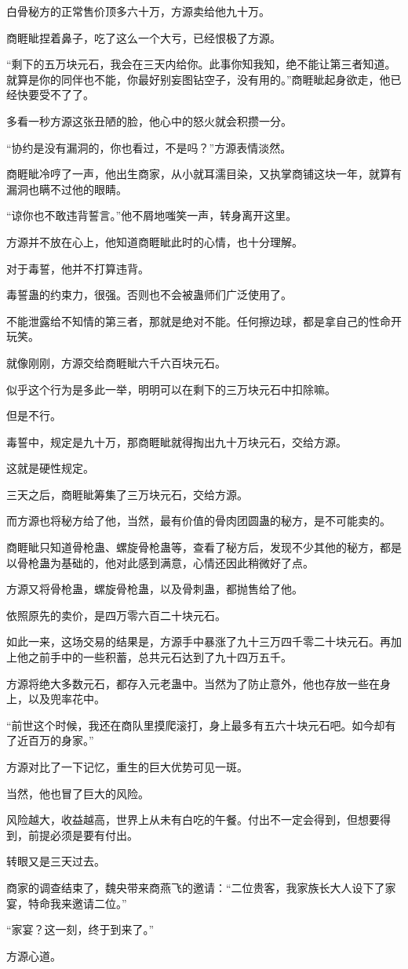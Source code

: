 \begin{this_body}
白骨秘方的正常售价顶多六十万，方源卖给他九十万。

商睚眦捏着鼻子，吃了这么一个大亏，已经恨极了方源。

“剩下的五万块元石，我会在三天内给你。此事你知我知，绝不能让第三者知道。就算是你的同伴也不能，你最好别妄图钻空子，没有用的。”商睚眦起身欲走，他已经快要受不了了。

多看一秒方源这张丑陋的脸，他心中的怒火就会积攒一分。

“协约是没有漏洞的，你也看过，不是吗？”方源表情淡然。

商睚眦冷哼了一声，他出生商家，从小就耳濡目染，又执掌商铺这块一年，就算有漏洞也瞒不过他的眼睛。

“谅你也不敢违背誓言。”他不屑地嗤笑一声，转身离开这里。

方源并不放在心上，他知道商睚眦此时的心情，也十分理解。

对于毒誓，他并不打算违背。

毒誓蛊的约束力，很强。否则也不会被蛊师们广泛使用了。

不能泄露给不知情的第三者，那就是绝对不能。任何擦边球，都是拿自己的性命开玩笑。

就像刚刚，方源交给商睚眦六千六百块元石。

似乎这个行为是多此一举，明明可以在剩下的三万块元石中扣除嘛。

但是不行。

毒誓中，规定是九十万，那商睚眦就得掏出九十万块元石，交给方源。

这就是硬性规定。

三天之后，商睚眦筹集了三万块元石，交给方源。

而方源也将秘方给了他，当然，最有价值的骨肉团圆蛊的秘方，是不可能卖的。

商睚眦只知道骨枪蛊、螺旋骨枪蛊等，查看了秘方后，发现不少其他的秘方，都是以骨枪蛊为基础的，他对此感到满意，心情还因此稍微好了点。

方源又将骨枪蛊，螺旋骨枪蛊，以及骨刺蛊，都抛售给了他。

依照原先的卖价，是四万零六百二十块元石。

如此一来，这场交易的结果是，方源手中暴涨了九十三万四千零二十块元石。再加上他之前手中的一些积蓄，总共元石达到了九十四万五千。

方源将绝大多数元石，都存入元老蛊中。当然为了防止意外，他也存放一些在身上，以及兜率花中。

“前世这个时候，我还在商队里摸爬滚打，身上最多有五六十块元石吧。如今却有了近百万的身家。”

方源对比了一下记忆，重生的巨大优势可见一斑。

当然，他也冒了巨大的风险。

风险越大，收益越高，世界上从未有白吃的午餐。付出不一定会得到，但想要得到，前提必须是要有付出。

转眼又是三天过去。

商家的调查结束了，魏央带来商燕飞的邀请：“二位贵客，我家族长大人设下了家宴，特命我来邀请二位。”

“家宴？这一刻，终于到来了。”

方源心道。

\end{this_body}

